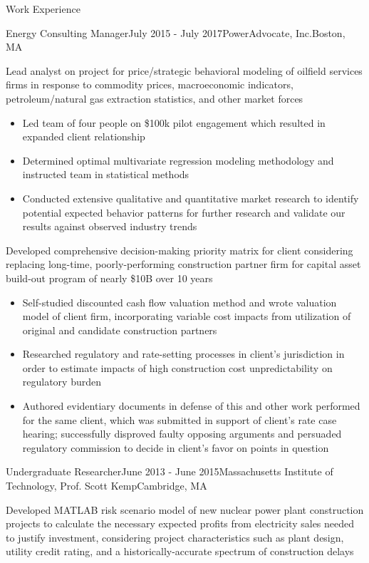 \documentclass{resume} %
\begin{document}
\begin{rSection}{Work Experience}
\begin{rSubsection}{Energy Consulting Manager}{July 2015 - July 2017}{PowerAdvocate, Inc.}{Boston, MA}
  \setlength{\itemsep}{-5pt}
  \item Lead analyst on project for price/strategic behavioral modeling of oilfield services firms in response to commodity prices, macroeconomic indicators, petroleum/natural gas extraction statistics, and other market forces
  \begin{itemize}
    \item Led team of four people on \$100k pilot engagement which resulted in expanded client relationship
    \item Determined optimal multivariate regression modeling methodology and instructed team in statistical methods
    \item Conducted extensive qualitative and quantitative market research to identify potential expected behavior patterns for further research and validate our results against observed industry trends
  \end{itemize}
  \item Developed comprehensive decision-making priority matrix for client considering replacing long-time, poorly-performing construction partner firm for capital asset build-out program of nearly \$10B over 10 years
  \begin{itemize}
    \item Self-studied discounted cash flow valuation method and wrote valuation model of client firm, incorporating variable cost impacts from utilization of original and candidate construction partners
    \item Researched regulatory and rate-setting processes in client's jurisdiction in order to estimate impacts of high construction cost unpredictability on regulatory burden
    \item Authored evidentiary documents in defense of this and other work performed for the same client, which was submitted in support of client's rate case hearing; successfully disproved faulty opposing arguments and persuaded regulatory commission to decide in client's favor on points in question
  \end{itemize}
\end{rSubsection}


\begin{rSubsection}{Undergraduate Researcher}{June 2013 - June 2015}{Massachusetts Institute of Technology, Prof. Scott Kemp}{Cambridge, MA}
  \setlength{\itemsep}{-5pt}
  \item Developed MATLAB risk scenario model of new nuclear power plant construction projects to calculate the necessary expected profits from electricity sales needed to justify investment, considering project characteristics such as plant design, utility credit rating, and a historically-accurate spectrum of construction delays
\end{rSubsection}

\end{rSection}
\end{document}
